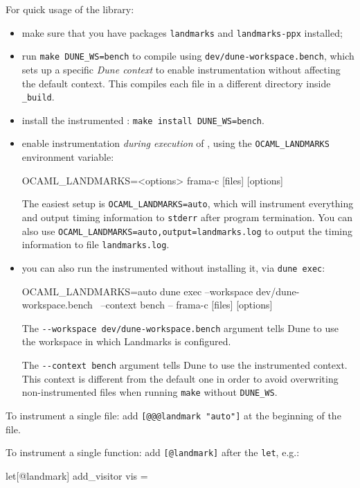 For quick usage of the library:
\begin{itemize}
\item make sure that you have packages \texttt{landmarks} and
  \texttt{landmarks-ppx} installed;
\item run \texttt{make DUNE\_WS=bench} to compile \framac using
  \texttt{dev/dune-workspace.bench}, which sets up a specific {\em Dune context}
  to enable instrumentation without affecting the default context.
  This compiles each \framac file in a different directory inside
  \texttt{\_build}.
\item install the instrumented \framac: \texttt{make install DUNE\_WS=bench}.
\item enable instrumentation {\em during execution} of \framac, using the
  \texttt{OCAML\_LANDMARKS} environment variable:
\begin{logs}
OCAML_LANDMARKS=<options> frama-c [files] [options]
\end{logs}
  The easiest setup is \texttt{OCAML\_LANDMARKS=auto}, which will instrument
  everything and output timing information to \texttt{stderr} after
  program termination.
  You can also use \texttt{OCAML\_LANDMARKS=auto,output=landmarks.log} to
  output the timing information to file \texttt{landmarks.log}.
\item you can also run the instrumented \framac without installing it, via
  \texttt{dune exec}:
\begin{logs}
OCAML_LANDMARKS=auto dune exec --workspace dev/dune-workspace.bench \
  --context bench -- frama-c [files] [options]
\end{logs}
  The \verb+--workspace dev/dune-workspace.bench+ argument tells Dune to use
  the workspace in which Landmarks is configured.

  The \verb+--context bench+ argument tells Dune to use the instrumented
  context. This context is different from the default one in order to avoid
  overwriting non-instrumented files when running \texttt{make} without
  \texttt{DUNE\_WS}.
\end{itemize}

To instrument a single file: add \verb+[@@@landmark "auto"]+ at the beginning
of the file.

To instrument a single function: add \verb+[@landmark]+ after the \texttt{let},
e.g.:

\begin{ocamlcode}
  let[@landmark] add_visitor vis =
\end{ocamlcode}

